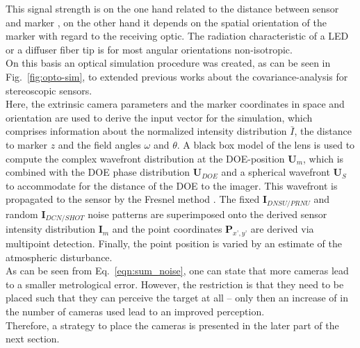 \documentclass[5p,times,procedia]{elsarticle}
\begin{document}
This signal strength is on the one hand related to the distance between sensor and marker \cite{dumbleton1955}, on the other hand it depends on the spatial orientation of the marker with regard to the receiving optic. The radiation characteristic of a LED or a diffuser fiber tip \cite{Pan1994} is for most angular orientations non-isotropic.\\
On this basis an optical simulation procedure was created, as can be seen in Fig.~\ref{fig:opto-sim}, to extended previous works \cite{Liu_2021,Di_Leo_2011} about the covariance-analysis for stereoscopic sensors.\\
Here, the extrinsic camera parameters and the marker coordinates in space and orientation are used to derive
the input vector for the simulation, which comprises information about the normalized intensity distribution $\bar{I}$, the distance to marker $z$ and the field angles $\omega$ and $\theta$. A black box model of the lens is used to compute the complex wavefront distribution at the DOE-position $\mathbf{U}_m$, which is combined with the DOE phase distribution $\mathbf{U}_{DOE}$ and a spherical wavefront $\mathbf{U}_{S}$ to accommodate for the distance of the DOE to the imager. This wavefront is propagated to the sensor by the Fresnel method \cite{Goodman2005}. The fixed $\mathbf{I}_{DNSU/PRNU}$ and random $\mathbf{I}_{DCN/SHOT}$ noise patterns are superimposed onto the derived sensor intensity distribution $\mathbf{I}_m$ and the point coordinates $\mathbf{P}_{x’,y’}$ are derived via multipoint detection.
Finally, the point position is varied by an estimate of the atmospheric disturbance.\\
As can be seen from Eq.~\ref{eqn:sum_noise}, one can state that more cameras lead to a smaller metrological error.
However, the restriction is  that they need to be placed such that they can perceive the target at all -- only then an increase of in the number of cameras used lead to an improved perception.\\
Therefore, a strategy to place the cameras is presented in the later part of the next section.
%
\end{document}
